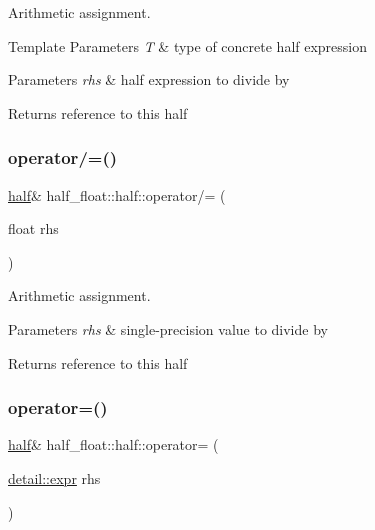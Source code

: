 Arithmetic assignment. 
\begin{DoxyTemplParams}{Template Parameters}
{\em T} & type of concrete half expression \\
\hline
\end{DoxyTemplParams}

\begin{DoxyParams}{Parameters}
{\em rhs} & half expression to divide by \\
\hline
\end{DoxyParams}
\begin{DoxyReturn}{Returns}
reference to this half 
\end{DoxyReturn}
\mbox{\label{classhalf__float_1_1half_a4a164803ca231d07f3b27c5c2bcf1715}} 
\subsubsection{\texorpdfstring{operator/=()}{operator/=()}\hspace{0.1cm}{\footnotesize\ttfamily [2/2]}}
{\footnotesize\ttfamily \hyperlink{classhalf__float_1_1half}{half}\& half\+\_\+float\+::half\+::operator/= (\begin{DoxyParamCaption}\item[{float}]{rhs }\end{DoxyParamCaption})\hspace{0.3cm}{\ttfamily [inline]}}

Arithmetic assignment. 
\begin{DoxyParams}{Parameters}
{\em rhs} & single-\/precision value to divide by \\
\hline
\end{DoxyParams}
\begin{DoxyReturn}{Returns}
reference to this half 
\end{DoxyReturn}
\mbox{\label{classhalf__float_1_1half_ada563d2964479ed1a325eca97933dc9f}} 
\subsubsection{\texorpdfstring{operator=()}{operator=()}\hspace{0.1cm}{\footnotesize\ttfamily [1/2]}}
{\footnotesize\ttfamily \hyperlink{classhalf__float_1_1half}{half}\& half\+\_\+float\+::half\+::operator= (\begin{DoxyParamCaption}\item[{\hyperlink{structhalf__float_1_1detail_1_1expr}{detail\+::expr}}]{rhs }\end{DoxyParamCaption})\hspace{0.3cm}{\ttfamily [inline]}}

